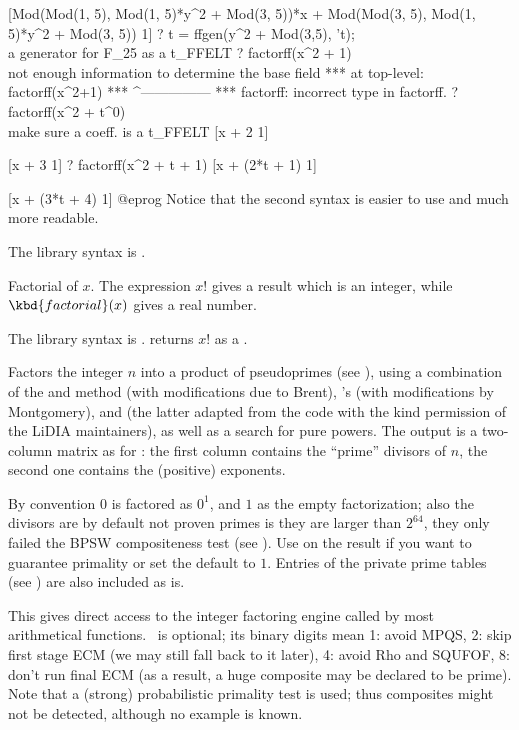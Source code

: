 [Mod(Mod(1, 5), Mod(1, 5)*y^2 + Mod(3, 5))*x
 + Mod(Mod(3, 5), Mod(1, 5)*y^2 + Mod(3, 5)) 1]
? t = ffgen(y^2 + Mod(3,5), 't); \\ a generator for F_25 as a t_FFELT
? factorff(x^2 + 1)   \\ not enough information to determine the base field
 ***   at top-level: factorff(x^2+1)
 ***                 ^---------------
 *** factorff: incorrect type in factorff.
? factorff(x^2 + t^0) \\ make sure a coeff. is a t_FFELT
[x + 2 1]

[x + 3 1]
? factorff(x^2 + t + 1)
[x + (2*t + 1) 1]

[x + (3*t + 4) 1]
@eprog\noindent
Notice that the second syntax is easier to use and much more readable.

The library syntax is .

\label{se:factorial}
Factorial of $x$. The expression $x!$ gives a result which is an integer,
while $\kbd{factorial}(x)$ gives a real number.

The library syntax is .
 returns $x!$ as a .

\label{se:factorint}
Factors the integer $n$ into a product of
pseudoprimes (see ), using a combination of the
 and  method (with modifications due to
Brent), 's  (with modifications by Montgomery), and
 (the latter adapted from the  code with the kind
permission of the LiDIA maintainers), as well as a search for pure powers.
The output is a two-column matrix as for : the first column
contains the ``prime'' divisors of $n$, the second one contains the
(positive) exponents.

By convention $0$ is factored as $0^1$, and $1$ as the empty factorization;
also the divisors are by default not proven primes is they are larger than
$2^{64}$, they only failed the BPSW compositeness test (see
). Use  on the result if you want to
guarantee primality or set the  default to $1$.
Entries of the private prime tables (see ) are also included
as is.

This gives direct access to the integer factoring engine called by most
arithmetical functions. \fl\ is optional; its binary digits mean 1: avoid
MPQS, 2: skip first stage ECM (we may still fall back to it later), 4: avoid
Rho and SQUFOF, 8: don't run final ECM (as a result, a huge composite may be
declared to be prime). Note that a (strong) probabilistic primality test is
used; thus composites might not be detected, although no example is known.

